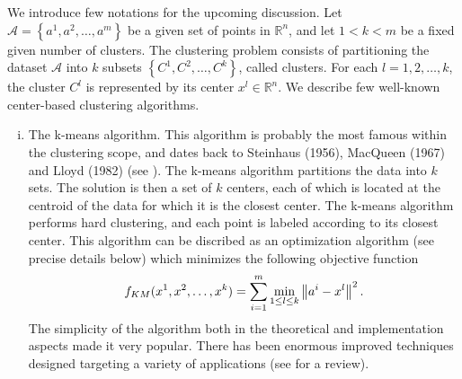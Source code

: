 We introduce few notations for the upcoming discussion. Let $\mathcal{A}= \left\lbrace a^1, a^2, \ldots ,a^m \right\rbrace$ be a given set of points in $\mathbb{R}^n$, and let $1 < k < m$ be a fixed given number of clusters. The clustering problem consists of partitioning the dataset $\mathcal{A}$ into $k$ subsets $\left\lbrace C^1, C^2, \ldots ,C^k \right\rbrace$, called clusters. For each $l=1, 2, \ldots ,k$, the cluster $C^l$ is represented by its center $x^l \in \mathbb{R}^n$. We describe few well-known center-based clustering algorithms.
\begin{enumerate}[(i)]
	\item The k-means algorithm. This algorithm is probably the most famous within the clustering scope, and dates back to Steinhaus (1956), MacQueen (1967) and Lloyd (1982) (see \cite{S1956,M1967,L1982}). The k-means algorithm partitions the data into $k$ sets. The solution is then a set of $k$ centers, each of which is located at the centroid of the data for which it is the closest center. The k-means algorithm performs hard clustering, and each point is labeled according to its closest center. This algorithm can be discribed as an optimization algorithm (see precise details below) which minimizes the following objective function
	\begin{equation*}
		f_{KM}(x^1,x^2,\ldots,x^k) = \sum\limits_{i=1}^{m}\min\limits_{1 \le l \le k} \left\Vert {a^i-x^l} \right\Vert^2.
	\end{equation*}
	The simplicity of the algorithm both in the theoretical and implementation aspects made it very popular. There has been enormous improved techniques designed targeting a variety of applications (see \cite{JMF1999} for a review).
	

\end{enumerate}

